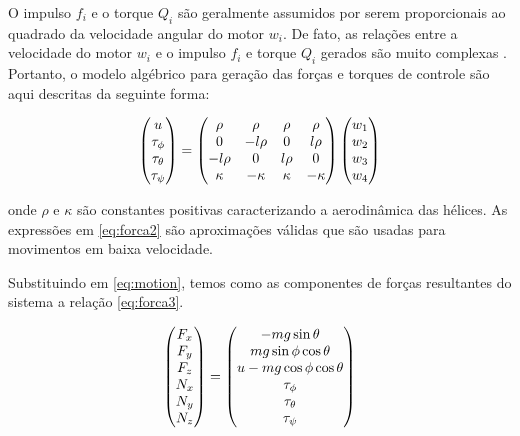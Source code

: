 \documentclass[a4paper, 12pt]{article}
\begin{document}
O impulso $f_i$ e o torque $Q_i$ são geralmente assumidos por serem proporcionais ao quadrado da velocidade angular do motor $w_i$. De fato, as relações entre a velocidade do motor $w_i$ e o impulso $f_i$ e torque $Q_i$ gerados são  muito complexas \cite{McCormick1995}\cite{Prouty1995}. Portanto, o modelo algébrico para geração das forças e torques de controle são aqui descritas da seguinte forma: 

\begin{equation}
\centering
\begin{pmatrix} 
	u \\ \tau _{ \phi  } \\ \tau _{ \theta  } \\ \tau _{ \psi  } 
\end{pmatrix}=
\begin{pmatrix}
	\rho  & \rho  & \rho  & \rho  \\ 
	0 & -l\rho  & 0 & l\rho  \\ 
	-l\rho  & 0 & l\rho  & 0 \\ 
	\kappa  & -\kappa  & \kappa  & -\kappa 
\end{pmatrix}
\begin{pmatrix}
	{ w }_{ 1 } \\ { w }_{ 2 } \\{ w }_{ 3 }\\ { w }_{ 4 }
\end{pmatrix}
\label{eq:forca2}
\end{equation}

\noindent onde $\rho$ e $\kappa$ são constantes positivas caracterizando a aerodinâmica das hélices. As expressões em \ref{eq:forca2} são aproximações válidas que são usadas para movimentos em baixa velocidade. 

Substituindo em \ref{eq:motion}, temos como as componentes de forças resultantes do sistema a relação \ref{eq:forca3}. 

\begin{equation}
\centering
\begin{pmatrix}
	F_x \\ F_y \\ F_z \\ N_x \\ N_y \\ N_z 
\end{pmatrix} = 
\begin{pmatrix}
-mg\sin{\theta} \\ mg\sin{\phi}\cos{\theta} \\ u - mg\cos{\phi}\cos{\theta} \\ \tau_{\phi} \\ \tau_{\theta} \\ \tau_{\psi} 
\end{pmatrix}
\label{eq:forca3}
\end{equation}
\end{document}
